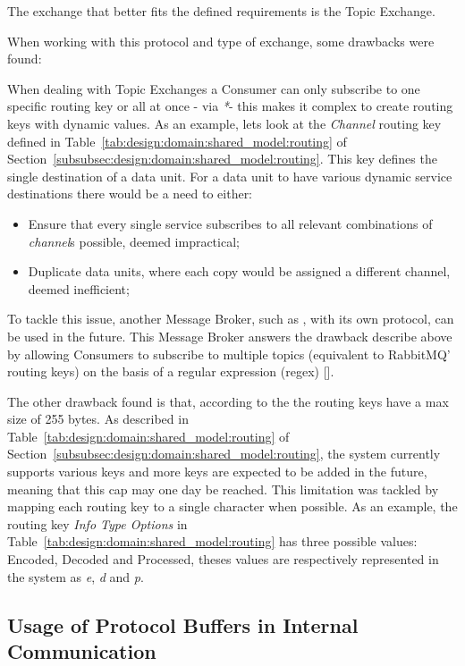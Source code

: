 The exchange that better fits the defined requirements is the Topic Exchange.

When working with this protocol and type of exchange, some drawbacks were found:

When dealing with Topic Exchanges a Consumer can only subscribe to one specific routing key or all at once - via \textit{*}- this makes it complex to create routing keys with dynamic values. As an example, lets look at the \textit{Channel} routing key defined in Table~\ref{tab:design:domain:shared_model:routing} of Section~\ref{subsubsec:design:domain:shared_model:routing}. This key defines the single destination of a data unit. For a data unit to have various dynamic service destinations there would be a need to either:

\begin{itemize}
    \item Ensure that every single service subscribes to all relevant combinations of \textit{channel}s possible, deemed impractical;
    \item Duplicate data units, where each copy would be assigned a different channel, deemed inefficient;
\end{itemize}

To tackle this issue, another Message Broker, such as , with its own protocol, can be used in the future. This Message Broker answers the drawback describe above by allowing Consumers to subscribe to multiple topics (equivalent to RabbitMQ' routing keys) on the basis of a regular expression (regex) [].

The other drawback found is that, according to the  the routing keys have a max size of 255 bytes. As described in Table~\ref{tab:design:domain:shared_model:routing} of Section~\ref{subsubsec:design:domain:shared_model:routing}, the system currently supports various keys and more keys are expected to be added in the future, meaning that this cap may one day be reached. This limitation was tackled by mapping each routing key to a single character when possible. As an example, the routing key \textit{Info Type Options} in Table~\ref{tab:design:domain:shared_model:routing} has three possible values: Encoded, Decoded and Processed, theses values are respectively represented in the system as \textit{e}, \textit{d} and \textit{p}.

\subsection{Usage of Protocol Buffers in Internal Communication}
\label{subsec:implementation:decisions:proto}

